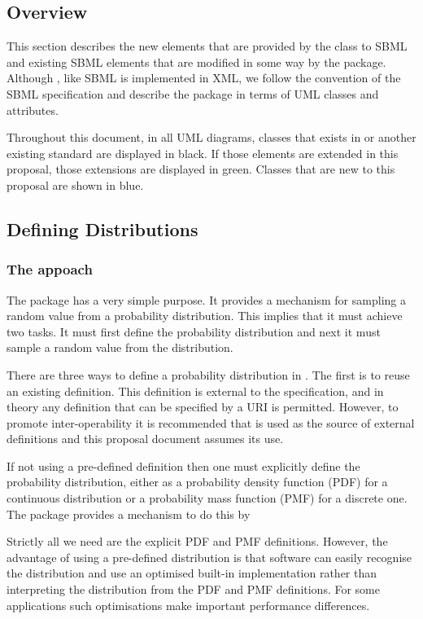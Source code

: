 \documentclass[draftspec]{sbmlpkgspec}
\begin{document}
\subsection{Overview}

This section describes the new elements that are provided by the class
to SBML and existing SBML elements that are modified in some way by
the package. Although \distribshort, like SBML is implemented in XML,
we follow the convention of the SBML specification and describe the
package in terms of UML classes and attributes.

Throughout this document, in all UML diagrams, classes that exists in
\sbmlverone or another existing standard are displayed in
black. If those elements are extended in this proposal, those
extensions are displayed in green. Classes that are new to this
proposal are shown in blue.

\subsection{Defining Distributions}

\subsubsection{The appoach}

The \distrib package has a very simple purpose. It provides a
mechanism for sampling a random value from a probability
distribution. This implies that it must achieve two tasks. It must
first define the probability distribution and next it must sample a
random value from the distribution.

There are three ways to define a probability distribution in
\distribshort. The first is to reuse an existing definition. This
definition is external to the \distribshort specification, and in
theory any definition that can be specified by a URI is permitted. However, to
promote inter-operability it is recommended that \uncertml is used as
the source of external definitions and this proposal document assumes
its use.

If not using a pre-defined definition then one must explicitly define
the probability distribution, either as a probability density function (PDF)
for a continuous distribution or a probability mass function (PMF) for
a discrete one. The \distrib package provides a mechanism to do this
by 

Strictly all we need are the explicit PDF and PMF
definitions. However, the advantage of using a pre-defined
distribution is that software can easily recognise the distribution
and use an optimised built-in implementation rather than interpreting
the distribution from the PDF and PMF definitions. For some
applications such optimisations make important performance
differences.
\end{document}
